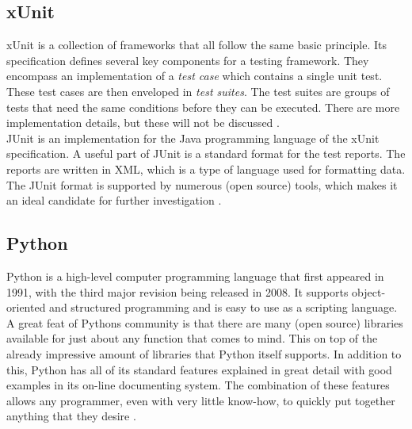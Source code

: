 \documentclass[11pt,british]{article}
\begin{document}
\subsection{xUnit}
\label{subsec:xUnit}
xUnit is a collection of frameworks that all follow the same basic principle. Its specification defines several key components for a testing framework. They encompass an implementation of a \emph{test case} which contains a single unit test. These test cases are then enveloped in \emph{test suites}. The test suites are groups of tests that need the same conditions before they can be executed. There are more implementation details, but these will not be discussed \cite{xunit2}.
\\[\baselineskip]
JUnit is an implementation for the Java programming language of the xUnit specification. A useful part of JUnit is a standard format for the test reports. The reports are written in \gls{XML}, which is a type of language used for formatting data. The JUnit format is supported by numerous (open source) tools, which makes it an ideal candidate for further investigation \cite{xunit,junitxml,junit}.

\subsection{Python}
Python is a high-level computer programming language that first appeared in 1991, with the third major revision being released in 2008. It supports object-oriented and structured programming and is easy to use as a scripting language. A great feat of Pythons community is that there are many (open source) libraries available for just about any function that comes to mind. This on top of the already impressive amount of libraries that Python itself supports. In addition to this, Python has all of its standard features explained in great detail with good examples in its on-line documenting system. The combination of these features allows any programmer, even with very little know-how, to quickly put together anything that they desire \cite{python1}.

\end{document}
